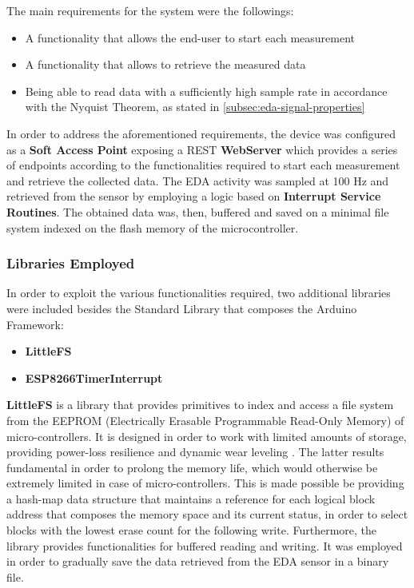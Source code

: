 The main requirements for the system were the followings:

\begin{itemize}
    \item A functionality that allows the end-user to start each measurement
    \item A functionality that allows to retrieve the measured data
    \item Being able to read data with a sufficiently high sample rate in accordance with the Nyquist Theorem, as stated in \ref{subsec:eda-signal-properties}
\end{itemize}

%
%

In order to address the aforementioned requirements, the device was configured as a \textbf{Soft Access Point} exposing a REST \textbf{WebServer} which provides a series of endpoints according to the functionalities required to start each measurement and retrieve the collected data. The EDA activity was sampled at 100 Hz and retrieved from the sensor by employing a logic based on \textbf{Interrupt Service Routines}. The obtained data was, then, buffered and saved on a minimal file system indexed on the flash memory of the microcontroller.

\subsubsection{Libraries Employed}\label{subsubsec:libraries-employed}

In order to exploit the various functionalities required, two additional libraries were included besides the Standard Library that composes the Arduino Framework:

\begin{itemize}
    \item \textbf{LittleFS}
    \item \textbf{ESP8266TimerInterrupt}
\end{itemize}

\textbf{LittleFS} is a library that provides primitives to index and access a file system from the EEPROM (Electrically Erasable Programmable Read-Only Memory) of micro-controllers. It is designed in order to work with limited amounts of storage, providing power-loss resilience and dynamic wear leveling \cite{littlefs}. The latter results fundamental in order to prolong the memory life, which would otherwise be extremely limited in case of micro-controllers. This is made possible be providing a hash-map data structure that maintains a reference for each logical block address that composes the memory space and its current status, in order to select blocks with the lowest erase count for the following write. Furthermore, the library provides functionalities for buffered reading and writing. It was employed in order to gradually save the data retrieved from the EDA sensor in a binary file.

